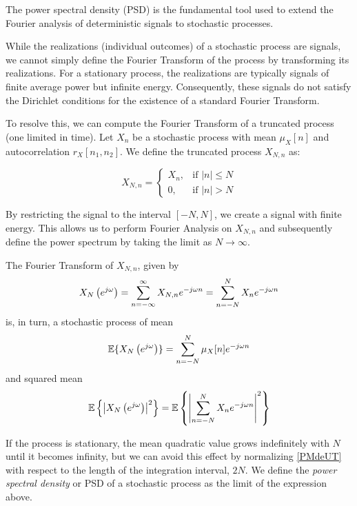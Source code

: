 The power spectral density (PSD) is the fundamental tool used to extend the Fourier analysis of deterministic signals to stochastic processes.

While the realizations (individual outcomes) of a stochastic process are signals, we cannot simply define the Fourier Transform of the process by transforming its realizations. For a stationary process, the realizations are typically signals of finite average power but infinite energy. Consequently, these signals do not satisfy the Dirichlet conditions for the existence of a standard Fourier Transform.

To resolve this, we can compute the Fourier Transform of a truncated process (one limited in time). Let $X_n$ be a stochastic process with mean $\mu_X[n]$ and autocorrelation $r_X[n_1, n_2]$. We define the truncated process $X_{N,n}$ as:

\begin{equation}
X_{N,n} = \begin{cases} 
    X_n, & \text{if } |n| \leq N \\ 
    0,   & \text{if } |n| > N 
\end{cases}
\end{equation}

By restricting the signal to the interval $[-N, N]$, we create a signal with finite energy. This allows us to perform Fourier Analysis on $X_{N,n}$ and subsequently define the power spectrum by taking the limit as $N \to \infty$.

The Fourier Transform of $X_{N,n}$, given by
\begin{equation}
X_N\left(e^{j \omega}\right)
	= \sum_{n=-\infty}^\infty X_{N,n} e^{-j \omega n}
    = \sum_{n=-N}^N X_n e^{-j \omega n}
\end{equation}
is, in turn, a stochastic process of mean
\begin{equation}
\mathbb{E}\{X_N\left(e^{j \omega}\right)\} = \sum_{n=-N}^N \mu_X[n] e^{-j \omega n}
\end{equation}
and squared mean
\begin{equation}
\mathbb{E}\left\{\left|X_N\left(e^{j \omega}\right)\right|^2\right\} 
	= \mathbb{E}\left\{\left|\sum_{n=-N}^N X_n e^{-j \omega n} \right|^2 \right \}
\label{PMdeUT}
\end{equation}

If the process is stationary, the mean quadratic value grows indefinitely with $N$ until it becomes infinity, but we can avoid this effect by normalizing \eqref{PMdeUT} with respect to the length of the integration interval, $2N$. We define the \textsl{power spectral density} or
PSD of a stochastic process as the limit of the expression above.

